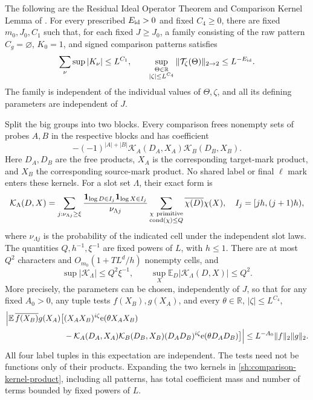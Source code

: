 \begin{proposition}
\label{sh:ideal}
The following are the Residual Ideal Operator Theorem and Comparison
Kernel Lemma of \cite[Section~4, Theorem~4.1 and Lemma~4.3]{SmoothShifted}.
For every prescribed $E_{\rm id}>0$ and fixed $C_4\geq0$, there are
fixed $m_0,J_0,C_1$ such that, for each fixed $J\geq J_0$, a family
consisting of the raw pattern $C_g=\varnothing$, $K_0=1$, and signed
comparison patterns satisfies
\begin{equation}\label{sh:ideal-bound}
 \sum_\nu\sup|K_\nu|\leq L^{C_1},\qquad
 \sup_{\substack{\Theta\in\mathbb R\\|\zeta|\leq L^{C_4}}}
       \|\mathcal T_\zeta(\Theta)\|_{2\to2}
       \leq L^{-E_{\rm id}}.
\end{equation}
The family is independent of the individual values of $\Theta,\zeta$,
and all its defining parameters are independent of $J$.

Split the big groups into two blocks.  Every comparison frees
nonempty sets of probes $A,B$ in the respective blocks and has
coefficient
\begin{equation}\label{sh:comparison-kernel-product}
 -(-1)^{|A|+|B|}\mathcal K_A(D_A,X_A)\mathcal K_B(D_B,X_B).
\end{equation}
Here $D_A,D_B$ are the free products, $X_A$ is the corresponding
target-mark product, and $X_B$ the corresponding source-mark product.
No shared label or final $\ell$ mark enters these kernels.  For a
slot set $\Lambda$, their exact form is
\begin{equation}\label{sh:kernel}
 \mathcal K_\Lambda(D,X)
 =\sum_{j:\nu_{\Lambda j}\geq\xi}
   \frac{\mathbf{1}_{\log D\in I_j}\mathbf{1}_{\log X\in I_j}}{\nu_{\Lambda j}}
   \sum_{\substack{\chi\ {\rm primitive}\\
                    \operatorname{cond}(\chi)\leq Q}}
               \overline{\chi(D)}\chi(X),
 \quad I_j=[jh,(j+1)h),
\end{equation}
where $\nu_{\Lambda j}$ is the probability of the indicated cell
under the independent slot laws.  The quantities $Q,h^{-1},\xi^{-1}$
are fixed powers of $L$, with $h\leq1$.  There are at most $Q^2$
characters and $O_{m_0}(1+TL^d/h)$ nonempty cells, and
\[
 \sup|\mathcal K_\Lambda|\leq Q^2\xi^{-1},\qquad
 \sup_X\mathbb E_D|\mathcal K_\Lambda(D,X)|\leq Q^2.
\]
More precisely, the parameters can be chosen, independently of $J$,
so that for any fixed $A_0>0$, any tuple tests $f(X_B),g(X_A)$,
and every $\theta\in\mathbb R$, $|\zeta|\leq L^{C_4}$,
\begin{align}
 \Big|\mathbb E\,\overline{f(X_B)}g(X_A)
 \big[&(X_AX_B)^{i\zeta}\mathrm{e}(\theta X_AX_B)\notag\\
 &-\mathcal K_A(D_A,X_A)\mathcal K_B(D_B,X_B)
       (D_AD_B)^{i\zeta}\mathrm{e}(\theta D_AD_B)\big]\Big|
 \leq L^{-A_0}\|f\|_2\|g\|_2.
 \label{sh:comparison-contract}
\end{align}
All four label tuples in this expectation are independent.  The tests
need not be functions only of their products.  Expanding the two
kernels in \eqref{sh:comparison-kernel-product}, including all
patterns, has total coefficient mass and number of terms bounded by
fixed powers of $L$.
\end{proposition}

